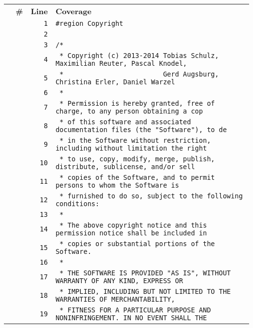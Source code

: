 \documentclass[a4paper,10pt]{article}
\begin{document}
\begin{longtable}[l]{lrrl}
\textbf{} & \textbf{\#} & \textbf{Line} & \textbf{Coverage}\\
\cellcolor{gray} &  & \verb~1~ & \verb~#region Copyright~\\
\cellcolor{gray} &  & \verb~2~ & \verb~~\\
\cellcolor{gray} &  & \verb~3~ & \verb~/*~\\
\cellcolor{gray} &  & \verb~4~ & \verb~ * Copyright (c) 2013-2014 Tobias Schulz, Maximilian Reuter, Pascal Knodel,~\\
\cellcolor{gray} &  & \verb~5~ & \verb~ *                         Gerd Augsburg, Christina Erler, Daniel Warzel~\\
\cellcolor{gray} &  & \verb~6~ & \verb~ *~\\
\cellcolor{gray} &  & \verb~7~ & \verb~ * Permission is hereby granted, free of charge, to any person obtaining a cop~\\
\cellcolor{gray} &  & \verb~8~ & \verb~ * of this software and associated documentation files (the "Software"), to de~\\
\cellcolor{gray} &  & \verb~9~ & \verb~ * in the Software without restriction, including without limitation the right~\\
\cellcolor{gray} &  & \verb~10~ & \verb~ * to use, copy, modify, merge, publish, distribute, sublicense, and/or sell~\\
\cellcolor{gray} &  & \verb~11~ & \verb~ * copies of the Software, and to permit persons to whom the Software is~\\
\cellcolor{gray} &  & \verb~12~ & \verb~ * furnished to do so, subject to the following conditions:~\\
\cellcolor{gray} &  & \verb~13~ & \verb~ *~\\
\cellcolor{gray} &  & \verb~14~ & \verb~ * The above copyright notice and this permission notice shall be included in ~\\
\cellcolor{gray} &  & \verb~15~ & \verb~ * copies or substantial portions of the Software.~\\
\cellcolor{gray} &  & \verb~16~ & \verb~ *~\\
\cellcolor{gray} &  & \verb~17~ & \verb~ * THE SOFTWARE IS PROVIDED "AS IS", WITHOUT WARRANTY OF ANY KIND, EXPRESS OR~\\
\cellcolor{gray} &  & \verb~18~ & \verb~ * IMPLIED, INCLUDING BUT NOT LIMITED TO THE WARRANTIES OF MERCHANTABILITY,~\\
\cellcolor{gray} &  & \verb~19~ & \verb~ * FITNESS FOR A PARTICULAR PURPOSE AND NONINFRINGEMENT. IN NO EVENT SHALL THE~\\

\end{longtable}
\end{document}
